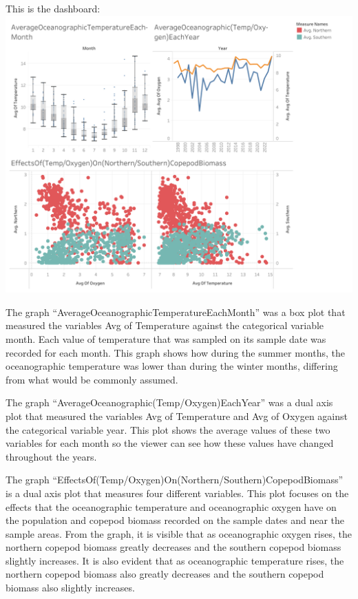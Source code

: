 \documentclass[
  letterpaper,
  DIV=11,
  numbers=noendperiod]{scrreprt}
\begin{document}
This is the dashboard:
\includegraphics{NewportOceanographicDatasetDashboard.png}

The graph ``AverageOceanographicTemperatureEachMonth'' was a box plot
that measured the variables Avg of Temperature against the categorical
variable month. Each value of temperature that was sampled on its sample
date was recorded for each month. This graph shows how during the summer
months, the oceanographic temperature was lower than during the winter
months, differing from what would be commonly assumed.

The graph ``AverageOceanographic(Temp/Oxygen)EachYear'' was a dual axis
plot that measured the variables Avg of Temperature and Avg of Oxygen
against the categorical variable year. This plot shows the average
values of these two variables for each month so the viewer can see how
these values have changed throughout the years.

The graph ``EffectsOf(Temp/Oxygen)On(Northern/Southern)CopepodBiomass''
is a dual axis plot that measures four different variables. This plot
focuses on the effects that the oceanographic temperature and
oceanographic oxygen have on the population and copepod biomass recorded
on the sample dates and near the sample areas. From the graph, it is
visible that as oceanographic oxygen rises, the northern copepod biomass
greatly decreases and the southern copepod biomass slightly increases.
It is also evident that as oceanographic temperature rises, the northern
copepod biomass also greatly decreases and the southern copepod biomass
also slightly increases.
\end{document}

